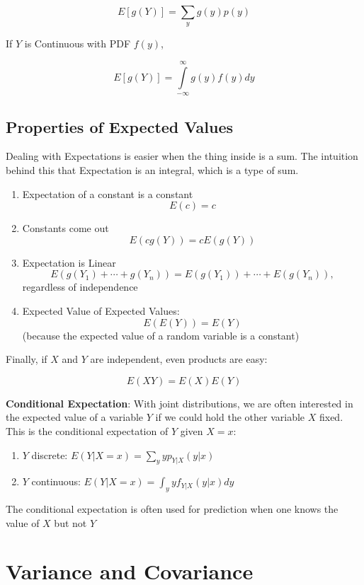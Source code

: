\documentclass[
]{book}
\providecommand{\tightlist}{%
  \setlength{\itemsep}{0pt}\setlength{\parskip}{0pt}}
\theoremstyle{definition}
\theoremstyle{definition}
\theoremstyle{definition}
\theoremstyle{definition}
\theoremstyle{remark}
\begin{document}
\[E[g(Y)]=\sum\limits_y g(y)p(y)\]

If \(Y\) is Continuous with PDF \(f(y)\),

\[E[g(Y)]=\int\limits_{-\infty}^\infty g(y)f(y)dy\]

\hypertarget{properties-of-expected-values}{%
\subsection*{Properties of Expected Values}\label{properties-of-expected-values}}

Dealing with Expectations is easier when the thing inside is a sum. The intuition behind this that Expectation is an integral, which is a type of sum.

\begin{enumerate}
\def\labelenumi{\arabic{enumi}.}
\tightlist
\item
  Expectation of a constant is a constant \[E(c)=c\]
\item
  Constants come out \[E(c g(Y))= c E(g(Y))\]
\item
  Expectation is Linear \[E(g(Y_1) + \cdots + g(Y_n))=E(g(Y_1)) +\cdots+E(g(Y_n)),\] regardless of independence
\item
  Expected Value of Expected Values: \[E(E(Y)) = E(Y)\] (because the expected value of a random variable is a constant)
\end{enumerate}

Finally, if \(X\) and \(Y\) are independent, even products are easy:

\[E(XY) = E(X)E(Y)\]

\textbf{Conditional Expectation}: With joint distributions, we are often interested in the expected value of a variable \(Y\) if we could hold the other variable \(X\) fixed. This is the conditional expectation of \(Y\) given \(X = x\):

\begin{enumerate}
\def\labelenumi{\arabic{enumi}.}
\tightlist
\item
  \(Y\) discrete: \(E(Y|X = x) = \sum_y yp_{Y|X}(y|x)\)
\item
  \(Y\) continuous: \(E(Y|X = x) = \int_y yf_{Y|X}(y|x)dy\)
\end{enumerate}

The conditional expectation is often used for prediction when one knows the value of \(X\) but not \(Y\)

\hypertarget{variance-and-covariance}{%
\section{Variance and Covariance}\label{variance-and-covariance}}
\end{document}
